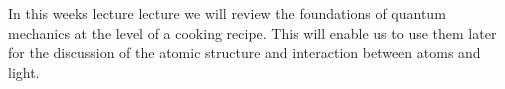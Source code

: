 In this weeks lecture  lecture we will review the foundations of quantum mechanics at the level of a cooking recipe. This will enable us to use them later for the discussion of the atomic structure and interaction between atoms and light.